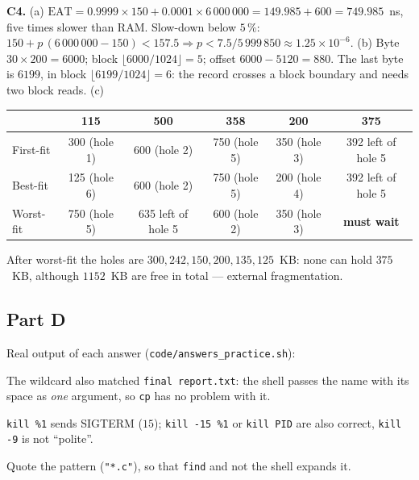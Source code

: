 \documentclass[11pt,a4paper]{article}
\newcommand{\cmd}[1]{\texttt{#1}}
\begin{document}
\textbf{C4.} (a) $\text{EAT} = 0.9999 \times 150 + 0.0001 \times 6\,000\,000 = 149.985 + 600 = 749.985$~ns, five times slower than RAM. Slow-down below $5\,\%$: $150 + p\,(6\,000\,000 - 150) < 157.5 \Rightarrow p < 7.5/5\,999\,850 \approx 1.25 \times 10^{-6}$. (b) Byte $30 \times 200 = 6000$; block $\lfloor 6000/1024 \rfloor = 5$; offset $6000 - 5120 = 880$. The last byte is $6199$, in block $\lfloor 6199/1024 \rfloor = 6$: the record crosses a block boundary and needs two block reads. (c)
\begin{center}
\small
\renewcommand{\arraystretch}{1.15}
\begin{tabular}{@{}lccccc@{}}
\toprule
& \textbf{115} & \textbf{500} & \textbf{358} & \textbf{200} & \textbf{375} \\
\midrule
First-fit & 300 (hole 1) & 600 (hole 2) & 750 (hole 5) & 350 (hole 3) & 392 left of hole 5 \\
Best-fit & 125 (hole 6) & 600 (hole 2) & 750 (hole 5) & 200 (hole 4) & 392 left of hole 5 \\
Worst-fit & 750 (hole 5) & 635 left of hole 5 & 600 (hole 2) & 350 (hole 3) & \textbf{must wait} \\
\bottomrule
\end{tabular}
\end{center}
After worst-fit the holes are $300, 242, 150, 200, 135, 125$~KB: none can hold $375$~KB, although $1152$~KB are free in total --- external fragmentation.

\subsection*{Part D}
Real output of each answer (\texttt{code/answers\_practice.sh}):



The wildcard also matched \texttt{final report.txt}: the shell passes the name with its space as \emph{one} argument, so \cmd{cp} has no problem with it.



\cmd{kill \%1} sends SIGTERM ($15$); \cmd{kill -15 \%1} or \cmd{kill PID} are also correct, \cmd{kill -9} is not ``polite''.

Quote the pattern (\texttt{"*.c"}), so that \cmd{find} and not the shell expands it.
\end{document}
